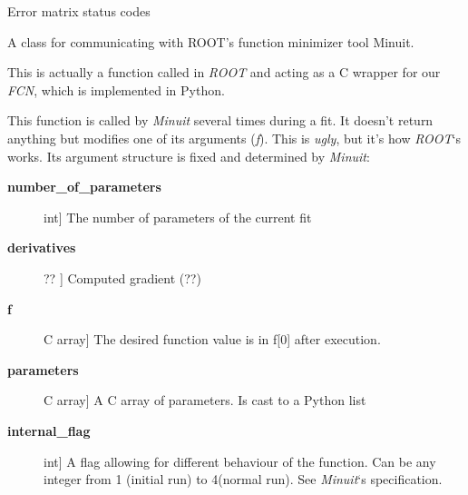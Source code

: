 \documentclass[a4paper,10pt,english]{sphinxmanual}
\begin{document}
\begin{fulllineitems}
\label{index:kafe.minuit.D_MATRIX_ERROR}
Error matrix status codes

\end{fulllineitems}


\begin{fulllineitems}
\label{index:kafe.minuit.Minuit}
A class for communicating with ROOT's function minimizer tool Minuit.

\begin{fulllineitems}
\label{index:kafe.minuit.Minuit.FCN_wrapper}
This is actually a function called in \emph{ROOT} and acting as a C wrapper 
for our \emph{FCN}, which is implemented in Python.

This function is called by \emph{Minuit} several times during a fit. It doesn't return
anything but modifies one of its arguments (\emph{f}). This is \emph{ugly}, but it's how \emph{ROOT}`s
 works. Its argument structure is fixed and determined by \emph{Minuit}:
\begin{description}
\item[{\textbf{number\_of\_parameters}}] \leavevmode{[}int{]}
The number of parameters of the current fit

\item[{\textbf{derivatives}}] \leavevmode{[}?? {]}
Computed gradient (??)

\item[{\textbf{f}}] \leavevmode{[}C array{]}
The desired function value is in f{[}0{]} after execution.

\item[{\textbf{parameters}}] \leavevmode{[}C array{]}
A C array of parameters. Is cast to a Python list

\item[{\textbf{internal\_flag}}] \leavevmode{[}int{]}
A flag allowing for different behaviour of the function.
Can be any integer from 1 (initial run) to 4(normal run). See \emph{Minuit}`s specification.


\end{description}
\end{fulllineitems}
\end{fulllineitems}
\end{document}
